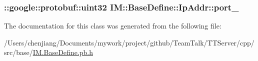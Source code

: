 \subsubsection[{port\+\_\+}]{\setlength{\rightskip}{0pt plus 5cm}\+::google\+::protobuf\+::uint32 I\+M\+::\+Base\+Define\+::\+Ip\+Addr\+::port\+\_\+\hspace{0.3cm}{\ttfamily [private]}}\label{class_i_m_1_1_base_define_1_1_ip_addr_aa99a859ecdfacb9e0c8ba90711bce58c}


The documentation for this class was generated from the following file\+:\begin{DoxyCompactItemize}
\item 
/\+Users/chenjiang/\+Documents/mywork/project/github/\+Team\+Talk/\+T\+T\+Server/cpp/src/base/\hyperlink{_i_m_8_base_define_8pb_8h}{I\+M.\+Base\+Define.\+pb.\+h}\end{DoxyCompactItemize}
